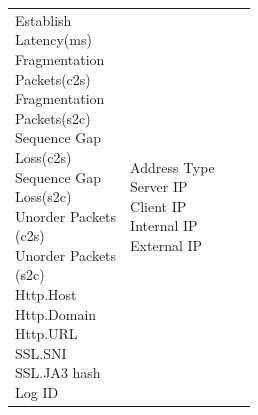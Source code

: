 \begin{description}
\begin{longtable}{p{}|p{}|p{}|p{}}
{                                                                            Establish\\ Latency(ms)\\
                                                                            Fragmentation\\ Packets(c2s)\\
                                                                            Fragmentation\\ Packets(s2c)\\
                                                                            Sequence Gap\\ Loss(c2s)\\
                                                                            Sequence Gap\\ Loss(s2c)\\
                                                                            Unorder Packets\\(c2s)\\
                                                                            Unorder Packets\\(s2c)\\
                                                                            Http.Host\\
                                                                            Http.Domain\\
                                                                            Http.URL\\
                                                                            SSL.SNI\\
                                                                            SSL.JA3 hash\\
                                                                            Log ID}  &  \tabincell{l}{Address Type\\
                                                                                                    Server IP\\
                                                                                                    Client IP\\
                                                                                                    Internal IP\\
                                                                                                    External IP\\
}
\end{longtable}
\end{description}

